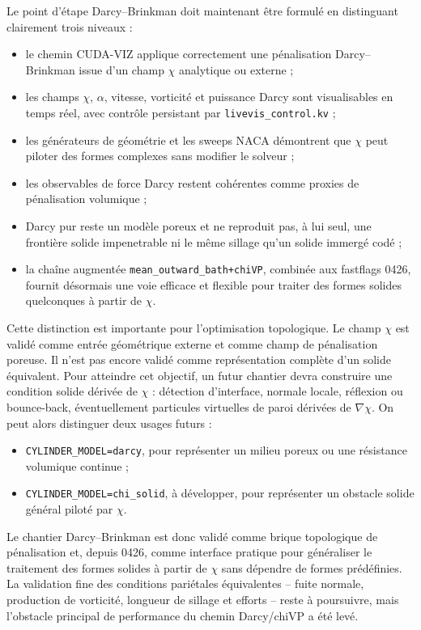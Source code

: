\documentclass[11pt,a4paper]{article}
\begin{document}
Le point d'étape Darcy--Brinkman doit maintenant être formulé en distinguant clairement trois niveaux :
\begin{itemize}[leftmargin=*]
  \item le chemin CUDA-VIZ applique correctement une pénalisation Darcy--Brinkman issue d'un champ $\chi$ analytique ou externe ;
  \item les champs $\chi$, $\alpha$, vitesse, vorticité et puissance Darcy sont visualisables en temps réel, avec contrôle persistant par \texttt{livevis\_control.kv} ;
  \item les générateurs de géométrie et les sweeps NACA démontrent que $\chi$ peut piloter des formes complexes sans modifier le solveur ;
  \item les observables de force Darcy restent cohérentes comme proxies de pénalisation volumique ;
  \item Darcy pur reste un modèle poreux et ne reproduit pas, à lui seul, une frontière solide impenetrable ni le même sillage qu'un solide immergé codé ;
  \item la chaîne augmentée \texttt{mean\_outward\_bath+chiVP}, combinée aux fastflags 0426, fournit désormais une voie efficace et flexible pour traiter des formes solides quelconques à partir de $\chi$.
\end{itemize}

Cette distinction est importante pour l'optimisation topologique. Le champ $\chi$ est validé comme entrée géométrique externe et comme champ de pénalisation poreuse. Il n'est pas encore validé comme représentation complète d'un solide équivalent. Pour atteindre cet objectif, un futur chantier devra construire une condition solide dérivée de $\chi$ : détection d'interface, normale locale, réflexion ou bounce-back, éventuellement particules virtuelles de paroi dérivées de $\nabla\chi$. On peut alors distinguer deux usages futurs :
\begin{itemize}[leftmargin=*]
  \item \texttt{CYLINDER\_MODEL=darcy}, pour représenter un milieu poreux ou une résistance volumique continue ;
  \item \texttt{CYLINDER\_MODEL=chi\_solid}, à développer, pour représenter un obstacle solide général piloté par $\chi$.
\end{itemize}

Le chantier Darcy--Brinkman est donc validé comme brique topologique de pénalisation et, depuis 0426, comme interface pratique pour généraliser le traitement des formes solides à partir de $\chi$ sans dépendre de formes prédéfinies. La validation fine des conditions pariétales équivalentes -- fuite normale, production de vorticité, longueur de sillage et efforts -- reste à poursuivre, mais l'obstacle principal de performance du chemin Darcy/chiVP a été levé.
\end{document}
